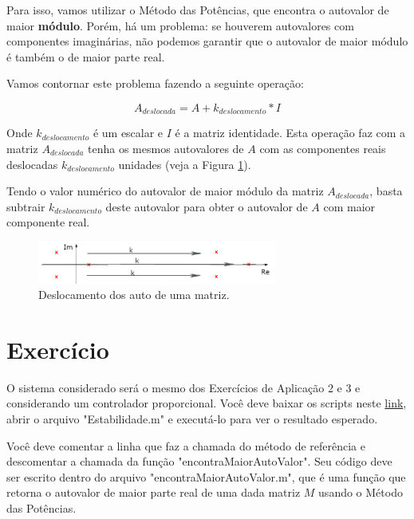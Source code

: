 \documentclass[12pt,a4paper,english,brazil]{article}
\begin{document}
Para isso, vamos utilizar o Método das Potências, que encontra o autovalor de maior \textbf{módulo}. Porém, há um problema: se houverem autovalores com componentes imaginárias, não podemos garantir que o autovalor de maior módulo é também o de maior parte real. \

Vamos contornar este problema fazendo a seguinte operação:

\begin{equation}
	A_{deslocada} = A + k_{deslocamento} * I 
\end{equation}

Onde $k_{deslocamento}$ é um escalar e $I$ é a matriz identidade. Esta operação faz com a matriz $A_{deslocada}$ tenha os mesmos autovalores de $A$ com as componentes reais deslocadas $k_{deslocamento}$ unidades (veja a Figura \ref{fig:deslocamento}). \

Tendo o valor numérico do autovalor de maior módulo da matriz $A_{deslocada}$, basta subtrair $k_{deslocamento}$ deste autovalor para obter o autovalor de $A$ com maior componente real. \

\begin{figure}[H]
\centering
\includegraphics[width=0.7\textwidth]{deslocamento.png}
\caption{\label{fig:deslocamento}Deslocamento dos auto de uma matriz.}
\end{figure}

\section{Exercício}\label{sec-exer}

O sistema considerado será o mesmo dos Exercícios de Aplicação 2 e 3 e considerando um controlador proporcional. Você deve baixar os scripts neste \href{https://drive.google.com/open?id=0B5SQdylJPM8CYjNXYl92TDR1M1U}{link}, abrir o arquivo "Estabilidade.m" e executá-lo para ver o resultado esperado. \ 

Você deve comentar a linha que faz a chamada do método de referência e descomentar a chamada da função "encontraMaiorAutoValor". Seu código deve ser escrito dentro do arquivo "encontraMaiorAutoValor.m", que é uma função que retorna o autovalor de maior parte real de uma dada matriz $M$ usando o Método das Potências. \ 
\end{document}
